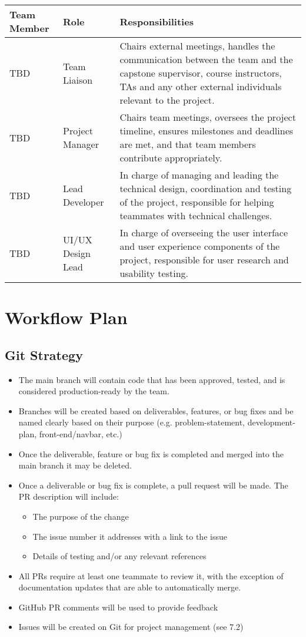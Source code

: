 \documentclass{article}
\begin{document}
\vspace{0.5cm}
\begin{tabularx}{\textwidth}{|l|l|X|}
  \hline
  \textbf{Team Member} & \textbf{Role} & \textbf{Responsibilities} \\
  \hline
  TBD & Team Liaison & Chairs external meetings, handles the communication between the team and the capstone 
  supervisor, course instructors, TAs and any other external individuals relevant to the project.\\
  \hline
  TBD & Project Manager & Chairs team meetings, oversees the project timeline, ensures milestones and deadlines 
  are met, and that team members contribute appropriately.\\
  \hline
  TBD & Lead Developer & In charge of managing and leading the technical design, coordination and testing of the 
  project, responsible for helping teammates with technical challenges. \\
  \hline
  TBD & UI/UX Design Lead & In charge of overseeing the user interface and user experience components of the project, 
  responsible for user research and usability testing.\\
  \hline
\end{tabularx}

\section{Workflow Plan}

\subsection{Git Strategy}
\begin{itemize}
	\item The main branch will contain code that has been approved, tested, and is considered production-ready by 
  the team.
	\item Branches will be created based on deliverables, features, or bug fixes and be named clearly based on their 
  purpose (e.g. problem-statement, development-plan, front-end/navbar, etc.) 
  \item Once the deliverable, feature or bug fix is completed and merged into the main branch it may be deleted.
	\item Once a deliverable or bug fix is complete, a pull request will be made. The PR description will include:
	\begin{itemize}
    \item The purpose of the change
    \item The issue number it addresses with a link to the issue
    \item Details of testing and/or any relevant references
  \end{itemize}
	\item All PRs require at least one teammate to review it, with the exception of documentation updates that are 
  able to automatically merge.
	\item GitHub PR comments will be used to provide feedback
	\item Issues will be created on Git for project management (see 7.2)
\end{itemize}
\end{document}
